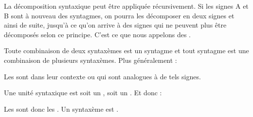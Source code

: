 La décomposition syntaxique peut être appliquée récursivement. Si les signes A et B sont à nouveau des syntagmes, on pourra les décomposer en deux signes et ainsi de suite, jusqu’à ce qu’on arrive à des signes qui ne peuvent plus être décomposés selon ce principe. C’est ce que nous appelons des .

Toute combinaison de deux syntaxèmes est un syntagme et tout syntagme est une combinaison de plusieurs syntaxèmes. Plus généralement :

{Les  sont  dans leur contexte ou qui sont analogues à de tels signes.}

Une unité syntaxique est soit un , soit un . Et donc :\largerpage

{Les  sont donc les . Un syntaxème est .}

